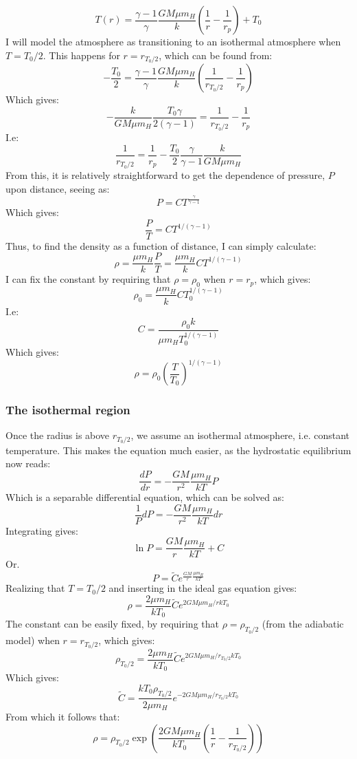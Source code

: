 \documentclass[a4paper,10pt,english]{article}
\begin{document}
$$T(r)=\frac{\gamma-1}{\gamma}\frac{GM\mu m_H}{k}\left(\frac{1}{r}-\frac{1}{r_p}\right)+T_0$$
I will model the atmosphere as transitioning to an isothermal atmosphere when $T=T_0/2$. This happens for $r=r_{T_0/2}$, which can be found from:
$$-\frac{T_0}{2}=\frac{\gamma-1}{\gamma}\frac{GM\mu m_H}{k}\left(\frac{1}{r_{T_0/2}}-\frac{1}{r_p}\right)$$
Which gives:
$$-\frac{k}{GM\mu m_H}\frac{T_0\gamma}{2(\gamma-1)}=\frac{1}{r_{T_0/2}}-\frac{1}{r_p}$$
I.e:
$$\frac{1}{r_{T_0/2}}=\frac{1}{r_p}-\frac{T_0}{2}\frac{\gamma}{\gamma-1}\frac{k}{GM\mu m_H}$$
From this, it is relatively straightforward to get the dependence of pressure, $P$ upon distance, seeing as:
$$P=CT^{\frac{\gamma}{\gamma-1}}$$
Which gives:
$$\frac{P}{T}=CT^{1/(\gamma-1)}$$
Thus, to find the density as a function of distance, I can simply calculate:
$$\rho=\frac{\mu m_H}{k}\frac{P}{T}=\frac{\mu m_H}{k}CT^{1/(\gamma-1)}$$
I can fix the constant by requiring that $\rho=\rho_0$ when $r=r_p$, which gives:
$$\rho_0=\frac{\mu m_H}{k}CT_0^{1/(\gamma-1)}$$
I.e:
$$C=\frac{\rho_0 k}{\mu m_H T_0^{1/(\gamma-1)}}$$
Which gives:
$$\rho=\rho_0\left(\frac{T}{T_0}\right) ^{1/(\gamma-1)}$$
\subsubsection{The isothermal region}
Once the radius is above $r_{T_0/2}$, we assume an isothermal atmosphere, i.e. constant temperature. This makes the equation much easier, as the hydrostatic equilibrium now reads:
$$\frac{dP}{dr}=-\frac{GM}{r^2}\frac{\mu m_H}{kT}P$$
Which is a separable differential equation, which can be solved as:
$$\frac{1}{P}dP=-\frac{GM}{r^2}\frac{\mu m_H}{kT}dr$$
Integrating gives:
$$\ln P=\frac{GM}{r}\frac{\mu m_H}{kT}+C$$
Or.
$$P=\tilde{C}e^{\frac{GM}{r}\frac{\mu m_H}{kT}}$$
Realizing that $T=T_0/2$ and inserting in the ideal gas equation gives:
$$\rho=\frac{2\mu m_H}{kT_0}\tilde{C}e^{2GM\mu m_H/rkT_0}$$
The constant can be easily fixed, by requiring that $\rho=\rho_{T_0/2}$ (from the adiabatic model) when $r=r_{T_0/2}$, which gives:
$$\rho_{T_0/2}=\frac{2\mu m_H}{kT_0}\tilde{C}e^{2GM\mu m_H/r_{T_0/2}kT_0}$$
Which gives:
$$\tilde{C}=\frac{kT_0\rho_{T_0/2}}{2\mu m_H}e^{-2GM\mu m_H/r_{T_0/2}kT_0}$$
From which it follows that:
$$\rho=\rho_{T_0/2}\exp\left(\frac{2GM\mu m_H}{kT_0}\left(\frac{1}{r}-\frac{1}{r_{T_0/2}}\right)\right)$$
\end{document}
